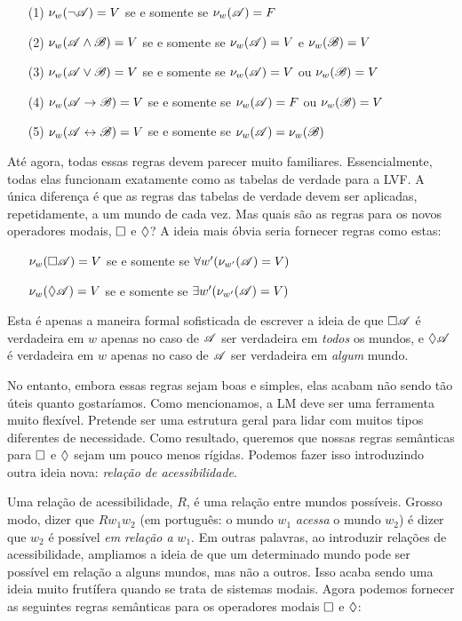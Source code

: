 \begin{itemize}
	\item[(1)]$\nu_w(\neg\mathscr{A})=V$ se e somente se $\nu_w(\mathscr{A})=F$
	\item[(2)]$\nu_w(\mathscr{A}\wedge\mathscr{B})=V$ se e somente se $\nu_w(\mathscr{A})=V$ e $\nu_w(\mathscr{B})=V$
	\item[(3)]$\nu_w(\mathscr{A}\vee\mathscr{B})=V$ se e somente se $\nu_w(\mathscr{A})=V$ ou $\nu_w(\mathscr{B})=V$
	\item[(4)]$\nu_w(\mathscr{A}\rightarrow\mathscr{B})=V$ se e somente se $\nu_w(\mathscr{A})=F$ ou $\nu_w(\mathscr{B})=V$
	\item[(5)]$\nu_w(\mathscr{A}\leftrightarrow\mathscr{B})=V$ se e somente se $\nu_w(\mathscr{A})=\nu_w(\mathscr{B})$  
\end{itemize}
 

Até agora, todas essas regras devem parecer muito familiares. Essencialmente, todas elas funcionam exatamente como as tabelas de verdade para a LVF. A única diferença é que as regras das tabelas de verdade devem ser aplicadas, repetidamente, a um mundo de cada vez.
Mas quais são as regras para os novos operadores modais, $\Box$ e $\Diamond$? A ideia mais óbvia seria fornecer regras como estas:
\begin{itemize}
	\item[]$\nu_w(\Box \mathscr{A})=V$ se e somente se $\forall w' (\nu_{w'}(\mathscr{A})=V)$
	\item[]$\nu_w(\Diamond \mathscr{A})=V $ se e somente se $\exists w' (\nu_{w'}(\mathscr{A})=V)$
\end{itemize}
Esta é apenas a maneira formal sofisticada de escrever a ideia de que $\Box\mathscr{A}$ é verdadeira em $w$ apenas no caso de $\mathscr{A}$ ser verdadeira em \emph{todos} os mundos, e $\Diamond\mathscr{A}$ é verdadeira em $w$ apenas no caso de $\mathscr{A}$ ser verdadeira em \emph{algum} mundo.

No entanto, embora essas regras sejam boas e simples, elas acabam não sendo tão úteis quanto gostaríamos. Como mencionamos, a LM deve ser uma ferramenta muito flexível. Pretende ser uma estrutura geral para lidar com muitos tipos diferentes de necessidade. Como resultado, queremos que nossas regras semânticas para  $\Box$ e $\Diamond$ sejam um pouco menos rígidas. Podemos fazer isso introduzindo outra ideia nova: \emph{relação de acessibilidade}.


Uma relação de acessibilidade, $R$, é uma relação entre mundos possíveis. Grosso modo, dizer que $Rw_1w_2$ (em português: o mundo $w_1$ \emph{acessa} o mundo $w_2$) é dizer que $w_2$ é possível  \emph{em relação a} $w_1$. Em outras palavras, ao introduzir relações de acessibilidade, ampliamos a ideia de que um determinado mundo pode ser possível em relação a alguns mundos, mas não a outros. Isso acaba sendo uma ideia muito frutífera quando se trata de sistemas modais. Agora podemos fornecer as seguintes regras semânticas para os operadores modais $\Box$ e $\Diamond$:


